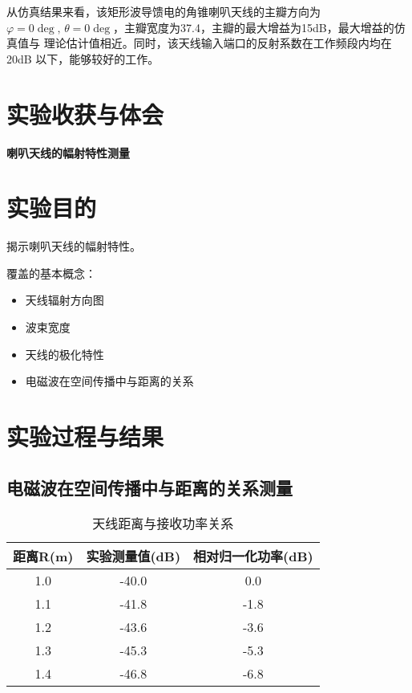 \documentclass{../source/Experiment}
\begin{document}
            从仿真结果来看，该矩形波导馈电的角锥喇叭天线的主瓣方向为$ \varphi = 0 \deg ,\, \theta = 0 \deg$，主瓣宽度为37.4\degree ，主瓣的最大增益为15dB，最大增益的仿真值与
            理论估计值相近。同时，该天线输入端口的反射系数在工作频段内均在20dB 以下，能够较好的工作。

    \section{实验收获与体会}

    \setcounter{section}{0}

    \begin{center}
        \bfseries\Large{喇叭天线的幅射特性测量}
    \end{center}

    \section{实验目的}
        揭示喇叭天线的幅射特性。 \par 
        覆盖的基本概念：
        \begin{itemize}
            \item 天线辐射方向图
            \item 波束宽度
            \item 天线的极化特性
            \item 电磁波在空间传播中与距离的关系
        \end{itemize}
    \section{实验过程与结果}
        \subsection{电磁波在空间传播中与距离的关系测量}
            \begin{table}[H]
                \caption{天线距离与接收功率关系}
                \centering
                \begin{tabular}{|c|c|c|}
                \hline
                距离R(m) & 实验测量值(dB) & 相对归一化功率(dB) \\ \hline
                1.0    & -40.0     & 0.0         \\ \hline
                1.1    & -41.8     & -1.8        \\ \hline
                1.2    & -43.6     & -3.6        \\ \hline
                1.3    & -45.3     & -5.3        \\ \hline
                1.4    & -46.8     & -6.8        \\ \hline
                \end{tabular}
            \end{table}
\end{document}
